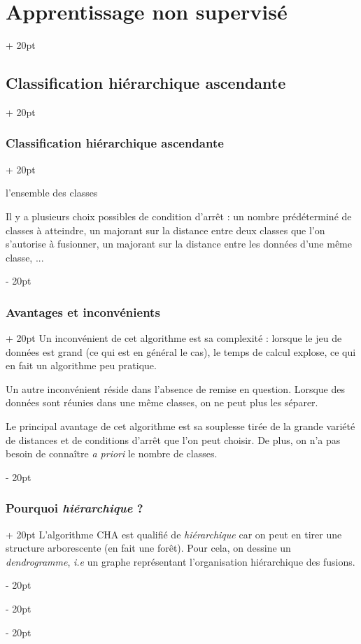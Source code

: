 \documentclass[a4paper, 12pt, twoside]{article}
\newenvironment{indalgo}[2][H]{
    \begin{algoBox}
        \begin{algorithm}[#1]
            \caption{#2}
}
{
        \end{algorithm}
    \end{algoBox}
}
\newcommand{\ind}[1][20pt]{\advance\leftskip + #1}
\newcommand{\deind}[1][20pt]{\advance\leftskip - #1}
\newenvironment{indt}[2][20pt]{#2 \par \ind[#1]}{\par \deind} %
\begin{document}
\begin{indt}{\section{Apprentissage non supervisé}}
\begin{indt}{\subsection{Classification hiérarchique ascendante}}
\begin{indt}{\subsubsection{Classification hiérarchique ascendante}}
\begin{indalgo}{Classification hiérarchique ascendante (CHA)}

                    \Return l'ensemble des classes\;
                \end{indalgo}

                Il y a plusieurs choix possibles de condition d'arrêt :
                un nombre prédéterminé de classes à atteindre, un majorant sur la distance entre deux classes que l'on s'autorise à fusionner, un majorant sur la distance entre les données d'une même classe, ...
            \end{indt}

            \vspace{12pt}
            
            \begin{indt}{\subsubsection{Avantages et inconvénients}}
                Un inconvénient de cet algorithme est sa complexité : lorsque le jeu de données est grand (ce qui est en général le cas), le temps de calcul explose, ce qui en fait un algorithme peu pratique.

                Un autre inconvénient réside dans l'absence de remise en question. Lorsque des données sont réunies dans une même classes, on ne peut plus les séparer.

                Le principal avantage de cet algorithme est sa souplesse tirée de la grande variété de distances et de conditions d'arrêt que l'on peut choisir. De plus, on n'a pas besoin de connaître \textit{a priori} le nombre de classes.
            \end{indt}

            \vspace{12pt}
            
            \begin{indt}{\subsubsection{Pourquoi \emph{hiérarchique} ?}}
                L'algorithme CHA est qualifié de \emph{hiérarchique} car on peut en tirer une structure arborescente (en fait une forêt). Pour cela, on dessine un \emph{dendrogramme}, \textit{i.e} un graphe représentant l'organisation hiérarchique des fusions.


\end{indt}
\end{indt}
\end{indt}
\end{document}
